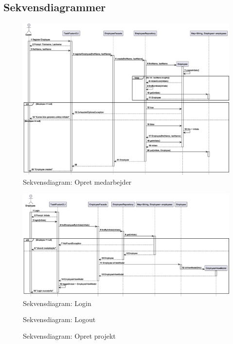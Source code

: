 \subsection{Sekvensdiagrammer}\label{sec:sequence}
\begin{figure}[H]
    \centering
    \caption{Sekvensdiagram: Opret medarbejder}\label{fig:sequenceRegisterEmployee}
    \includegraphics[width=\textwidth]{RequirementsAndDesign/SequenceDiagrams/seqRegisterEmployee.eps}
\end{figure}
\begin{figure}[H]
    \centering
    \caption{Sekvensdiagram: Login}\label{fig:sequenceLogin}
    \includegraphics[width=\textwidth]{RequirementsAndDesign/SequenceDiagrams/seqLogin.eps}
\end{figure}
\begin{figure}[H]
    \centering
    \caption{Sekvensdiagram: Logout}\label{fig:sequenceLogout}
\end{figure}
\begin{figure}[H]
    \centering
    \caption{Sekvensdiagram: Opret projekt}\label{fig:sequenceCreateProject}
\end{figure}
